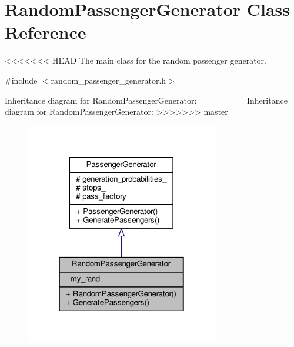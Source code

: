 \hypertarget{classRandomPassengerGenerator}{}\section{Random\+Passenger\+Generator Class Reference}
\label{classRandomPassengerGenerator}


<<<<<<< HEAD
The main class for the random passenger generator.  




{\ttfamily \#include $<$random\+\_\+passenger\+\_\+generator.\+h$>$}



Inheritance diagram for Random\+Passenger\+Generator\+:\nopagebreak
=======
Inheritance diagram for Random\+Passenger\+Generator\+:
\nopagebreak
>>>>>>> master
\begin{figure}[H]
\begin{center}
\leavevmode
\includegraphics[width=238pt]{classRandomPassengerGenerator__inherit__graph}
\end{center}
\end{figure}


